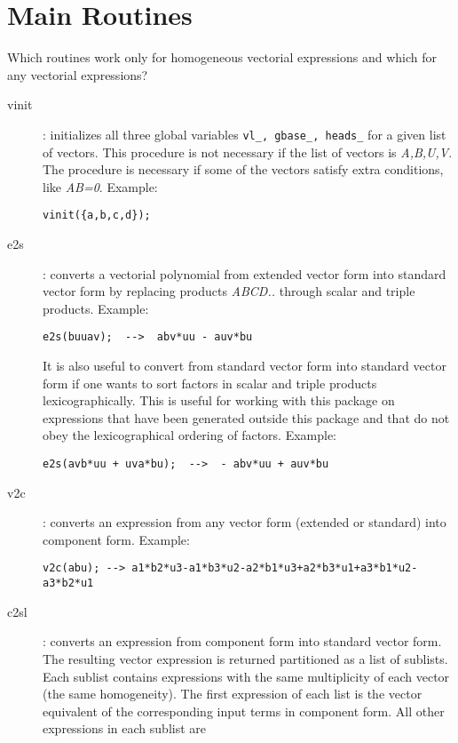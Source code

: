 \documentclass[12pt]{article}
\begin{document}
\section{Main Routines}
Which routines work only for homogeneous vectorial expressions and 
which for any vectorial expressions?
\begin{description}
  \item[vinit] : 
        initializes all three global variables {\tt vl\_, gbase\_, heads\_}
        for a given list of vectors. This procedure is not necessary if the
        list of vectors is {\it A,B,U,V}. The procedure is necessary if some
        of the vectors satisfy extra conditions, like {\it AB=0}. 
        Example: \begin{verbatim}
vinit({a,b,c,d}); \end{verbatim}
  \item[e2s] : 
        converts a vectorial polynomial from extended vector form into standard 
        vector form by replacing products {\it ABCD..} through scalar
        and triple products. Example: \begin{verbatim}
e2s(buuav);  -->  abv*uu - auv*bu \end{verbatim}
        It is also useful to convert from 
        standard vector form into standard vector form if one wants
        to sort factors in scalar and triple products lexicographically. 
        This is useful for working with this package on expressions 
        that have been generated outside this package and that do not obey
        the lexicographical ordering of factors. 
        Example: \begin{verbatim}
e2s(avb*uu + uva*bu);  -->  - abv*uu + auv*bu \end{verbatim}
  \item[v2c] : converts an expression from any vector form (extended or 
        standard) into component form. Example: \begin{verbatim}
v2c(abu); --> a1*b2*u3-a1*b3*u2-a2*b1*u3+a2*b3*u1+a3*b1*u2-a3*b2*u1\end{verbatim}
  \item[c2sl] : converts an expression from component form into
  standard vector form. The resulting vector expression is returned
  partitioned as a list of sublists. Each sublist contains expressions
  with the same multiplicity of each vector (the same homogeneity). 
  The first expression of
  each list is the vector equivalent of the corresponding input terms
  in component form. All other expressions in each sublist are

\end{description}
\end{document}
